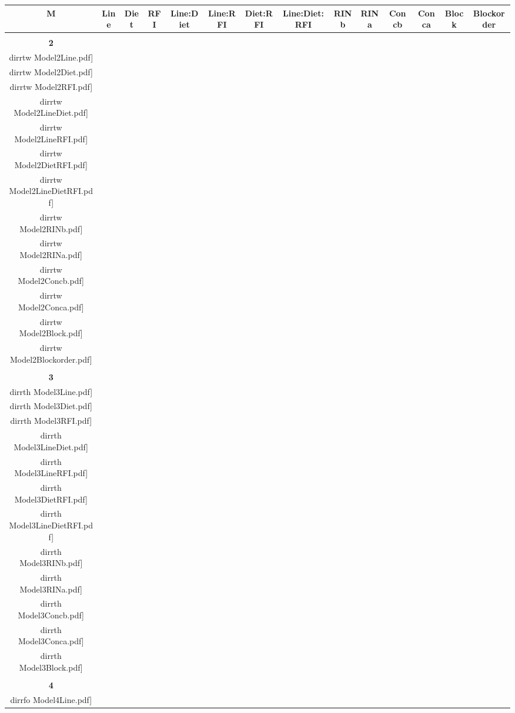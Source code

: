 \documentclass[landscape,a2paper, onecolumn]{paper}
\def \dirrtw {/run/user/1000/gvfs/smb-share:server=cyfiles.iastate.edu,share=09/22/ntyet/R/RA/Data/RFI-newdata/result/Model2.Line.Diet.RFI.Concb.RINb.Conca.RINa.Block.Blockorder.LineDiet.LineRFI.DietRFI.LineDietRFI/}
\def \dirrth {/run/user/1000/gvfs/smb-share:server=cyfiles.iastate.edu,share=09/22/ntyet/R/RA/Data/RFI-newdata/result/Model3.Line.Diet.RFI.Concb.RINb.Conca.RINa.Block.LineDiet.LineRFI.DietRFI.LineDietRFI/}
\def \dirrfo {/run/user/1000/gvfs/smb-share:server=cyfiles.iastate.edu,share=09/22/ntyet/R/RA/Data/RFI-newdata/result/Model4.Line.Diet.RFI.Concb.RINb.RINa.Block.LineDiet.LineRFI.DietRFI.LineDietRFI/}
\begin{document}
\begin{table}
\Huge
\centering
\begin{tabular}{cccccccccccccc}
      {\Huge \textbf{M}} 
      & {\Huge\textbf{ Line}} 
      &{\Huge \textbf{Diet}} 
      & {\Huge \textbf{RFI}}
      &{\Huge \textbf{Line:Diet}} 
      &{\Huge \textbf{Line:RFI}} 
      &{\Huge \textbf{Diet:RFI}} 
      &{\Huge \textbf{Line:Diet:RFI}} 
      &{\Huge\textbf{ RINb}} 
      &{\Huge \textbf{RINa}} 
      &{\Huge \textbf{Concb} } 
      &{\Huge \textbf{Conca} }
      &{\Huge \textbf{Block}} 
      &{\Huge \textbf{Blockorder}}\\[5pt]
      \hline
      \\[5pt]
      {\Huge \textbf{2}} 
      &\texttt{[image: \\dirrtw Model2Line.pdf]}
      &\texttt{[image: \\dirrtw Model2Diet.pdf]}
      &\texttt{[image: \\dirrtw Model2RFI.pdf]}
      &\texttt{[image: \\dirrtw Model2LineDiet.pdf]}
      &\texttt{[image: \\dirrtw Model2LineRFI.pdf]}
      &\texttt{[image: \\dirrtw Model2DietRFI.pdf]}
      &\texttt{[image: \\dirrtw Model2LineDietRFI.pdf]}
      &\texttt{[image: \\dirrtw Model2RINb.pdf]}
      &\texttt{[image: \\dirrtw Model2RINa.pdf]}
      &\texttt{[image: \\dirrtw Model2Concb.pdf]}
      &\texttt{[image: \\dirrtw Model2Conca.pdf]}
      &\texttt{[image: \\dirrtw Model2Block.pdf]}
      &\texttt{[image: \\dirrtw Model2Blockorder.pdf]}
     \\[5pt]
     \hline
     \\[5pt]
     {\Huge \textbf{3}} 
      &\texttt{[image: \\dirrth Model3Line.pdf]}
      &\texttt{[image: \\dirrth Model3Diet.pdf]}
      &\texttt{[image: \\dirrth Model3RFI.pdf]}
      &\texttt{[image: \\dirrth Model3LineDiet.pdf]}
      &\texttt{[image: \\dirrth Model3LineRFI.pdf]}
      &\texttt{[image: \\dirrth Model3DietRFI.pdf]}
      &\texttt{[image: \\dirrth Model3LineDietRFI.pdf]}
      &\texttt{[image: \\dirrth Model3RINb.pdf]}
      &\texttt{[image: \\dirrth Model3RINa.pdf]}
      &\texttt{[image: \\dirrth Model3Concb.pdf]}
      &\texttt{[image: \\dirrth Model3Conca.pdf]}
      &\texttt{[image: \\dirrth Model3Block.pdf]}
      &
     \\[5pt]
     \hline
     \\[5pt]
     {\Huge \textbf{4}} 
      &\texttt{[image: \\dirrfo Model4Line.pdf]}

\end{tabular}
\end{table}
\end{document}
